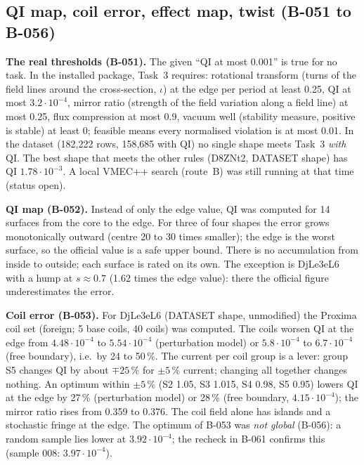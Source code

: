 \subsection{QI map, coil error, effect map, twist (B-051 to B-056)}
\textbf{The real thresholds (B-051).} The given ``QI at most 0.001'' is true for no task. In the installed package, Task~3 requires:
rotational transform (turns of the field lines around the cross-section, $\iota$) at the edge per period at least 0.25, QI at most $3.2\cdot10^{-4}$, mirror ratio (strength of the field variation along a field line) at most 0.25, flux compression
at most 0.9, vacuum well (stability measure, positive is stable) at least 0; feasible means every normalised violation is at most 0.01. In the dataset (182,222 rows, 158,685 with QI) no
single shape meets Task~3 \emph{with} QI. The best shape that meets the other rules (D8ZNt2, DATASET shape) has QI $1.78\cdot10^{-3}$. A local
VMEC++ search (route~B) was still running at that time (status open).

\textbf{QI map (B-052).} Instead of only the edge value, QI was computed for 14 surfaces from the core to the edge. For three of four
shapes the error grows monotonically outward (centre 20 to 30 times smaller); the edge is the worst surface, so the official value is a safe upper bound.
There is no accumulation from inside to outside; each surface is rated on its own. The exception is DjLe3eL6 with a hump at $s\approx0.7$
(1.62 times the edge value): there the official figure underestimates the error.

\textbf{Coil error (B-053).} For DjLe3eL6 (DATASET shape, unmodified) the Proxima coil set (foreign; 5 base coils, 40 coils) was computed. The
coils worsen QI at the edge from $4.48\cdot10^{-4}$ to $5.54\cdot10^{-4}$ (perturbation model) or $5.8\cdot10^{-4}$ to $6.7\cdot10^{-4}$ (free boundary), i.e.\ by 24 to 50\,\%. The current per coil group is a
lever: group S5 changes QI by about $\mp25$\,\% for $\pm5$\,\% current; changing all together changes nothing. An optimum within $\pm5$\,\% (S2 1.05, S3 1.015, S4 0.98,
S5 0.95) lowers QI at the edge by 27\,\% (perturbation model) or 28\,\% (free boundary, $4.15\cdot10^{-4}$); the mirror ratio rises from 0.359 to 0.376. The
coil field alone has islands and a stochastic fringe at the edge. The optimum of B-053 was \emph{not global} (B-056): a random sample lies lower at
$3.92\cdot10^{-4}$; the recheck in B-061 confirms this (sample 008: $3.97\cdot10^{-4}$).

